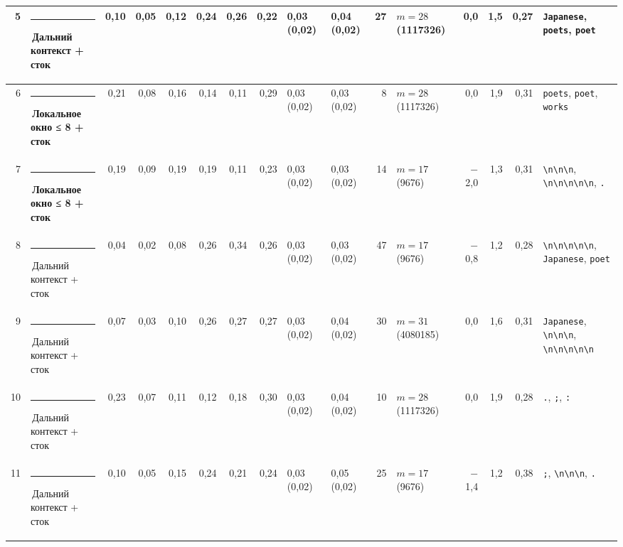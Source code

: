 \documentclass[10pt]{article}
\begin{document}
\begin{minipage}{\linewidth}
\begin{center}
{\begin{tabular}{|r|l|r|r|r|r|r|r|l|l|r|l|r|r|r|l|}
5 & \textcolor[HTML]{C3C2B7}{\rule{0.62em}{0.62em}}\,Дальний контекст + сток & 0,10 & 0,05 & 0,12 & 0,24 & 0,26 & 0,22 & 0,03 (0,02) & 0,04 (0,02) & 27 & $m{=}28$ (1117326) & 0,0 & 1,5 & 0,27 & \texttt{\textvisiblespace{}Japanese}, \texttt{\textvisiblespace{}poets}, \texttt{\textvisiblespace{}poet} \\ \hline
6 & \textcolor[HTML]{1BAF7A}{\rule{0.62em}{0.62em}}\,\textbf{Локальное окно ≤ 8 + сток} & 0,21 & 0,08 & 0,16 & 0,14 & 0,11 & 0,29 & 0,03 (0,02) & 0,03 (0,02) & 8 & $m{=}28$ (1117326) & 0,0 & 1,9 & 0,31 & \texttt{\textvisiblespace{}poets}, \texttt{\textvisiblespace{}poet}, \texttt{\textvisiblespace{}works} \\ \hline
7 & \textcolor[HTML]{1BAF7A}{\rule{0.62em}{0.62em}}\,\textbf{Локальное окно ≤ 8 + сток} & 0,19 & 0,09 & 0,19 & 0,19 & 0,11 & 0,23 & 0,03 (0,02) & 0,03 (0,02) & 14 & $m{=}17$ (9676) & $-$2,0 & 1,3 & 0,31 & \texttt{\textvisiblespace{}\textbackslash{}n\textbackslash{}n\textbackslash{}n}, \texttt{\textbackslash{}n\textbackslash{}n\textbackslash{}n\textbackslash{}n\textbackslash{}n}, \texttt{\textvisiblespace{}.} \\ \hline
8 & \textcolor[HTML]{C3C2B7}{\rule{0.62em}{0.62em}}\,Дальний контекст + сток & 0,04 & 0,02 & 0,08 & 0,26 & 0,34 & 0,26 & 0,03 (0,02) & 0,03 (0,02) & 47 & $m{=}17$ (9676) & $-$0,8 & 1,2 & 0,28 & \texttt{\textbackslash{}n\textbackslash{}n\textbackslash{}n\textbackslash{}n\textbackslash{}n}, \texttt{\textvisiblespace{}Japanese}, \texttt{\textvisiblespace{}poet} \\ \hline
9 & \textcolor[HTML]{C3C2B7}{\rule{0.62em}{0.62em}}\,Дальний контекст + сток & 0,07 & 0,03 & 0,10 & 0,26 & 0,27 & 0,27 & 0,03 (0,02) & 0,04 (0,02) & 30 & $m{=}31$ (4080185) & 0,0 & 1,6 & 0,31 & \texttt{\textvisiblespace{}Japanese}, \texttt{\textvisiblespace{}\textbackslash{}n\textbackslash{}n\textbackslash{}n}, \texttt{\textbackslash{}n\textbackslash{}n\textbackslash{}n\textbackslash{}n\textbackslash{}n} \\ \hline
10 & \textcolor[HTML]{C3C2B7}{\rule{0.62em}{0.62em}}\,Дальний контекст + сток & 0,23 & 0,07 & 0,11 & 0,12 & 0,18 & 0,30 & 0,03 (0,02) & 0,04 (0,02) & 10 & $m{=}28$ (1117326) & 0,0 & 1,9 & 0,28 & \texttt{\textvisiblespace{}.}, \texttt{\textvisiblespace{};}, \texttt{\textvisiblespace{}:} \\ \hline
11 & \textcolor[HTML]{C3C2B7}{\rule{0.62em}{0.62em}}\,Дальний контекст + сток & 0,10 & 0,05 & 0,15 & 0,24 & 0,21 & 0,24 & 0,03 (0,02) & 0,05 (0,02) & 25 & $m{=}17$ (9676) & $-$1,4 & 1,2 & 0,38 & \texttt{\textvisiblespace{};}, \texttt{\textvisiblespace{}\textbackslash{}n\textbackslash{}n\textbackslash{}n}, \texttt{\textvisiblespace{}.} \\ \hline

\end{tabular}}
\end{center}
\end{minipage}
\end{document}
